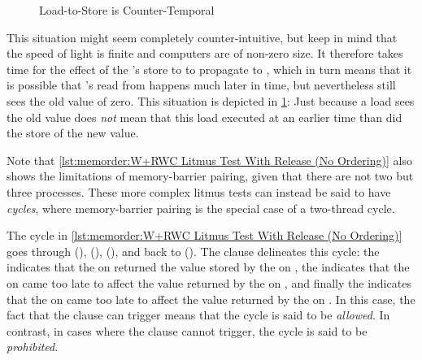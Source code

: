 \QuickQuizLabel{\MemorderQQLitmusTestR}

\begin{figure}
\centering
{}
\caption{Load-to-Store is Counter-Temporal}
\label{fig:memorder:Load-to-Store is Counter-Temporal}
\end{figure}

This situation might seem completely counter-intuitive, but keep
in mind that the speed of light is finite and computers are of
non-zero size.
It therefore takes time for the effect of the 's store to
 to propagate to , which in turn means that it is possible
that 's read from  happens much later in time, but
nevertheless still sees the old value of zero.
This situation is depicted in
\cref{fig:memorder:Load-to-Store is Counter-Temporal}:
Just because a load sees the old value does \emph{not} mean that
this load executed at an earlier time than did the store of the
new value.

Note that
\cref{lst:memorder:W+RWC Litmus Test With Release (No Ordering)}
also shows the limitations of memory-barrier pairing, given that
there are not two but three processes.
These more complex litmus tests can instead be said to have \emph{cycles},
where memory-barrier pairing is the special case of a two-thread cycle.
\begin{fcvref}
The cycle in
\cref{lst:memorder:W+RWC Litmus Test With Release (No Ordering)}
goes through  (),  (),
 (), and back to  ().
The  clause delineates this cycle:
the  indicates that the  on 
returned the value stored by the  on ,
the  indicates that the  on  came
too late to affect the value returned by the  on ,
and finally the  indicates that the
 on  came too late to affect the value returned
by the  on .
In this case, the fact that the  clause can trigger means that
the cycle is said to be \emph{allowed}.
In contrast, in cases where the  clause cannot trigger,
the cycle is said to be \emph{prohibited}.
\end{fcvref}

